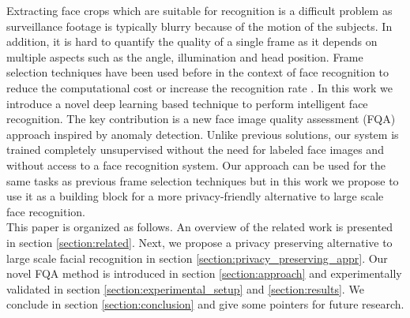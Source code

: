 \documentclass[letterpaper]{article} %
\begin{document}
Extracting face crops which are suitable for recognition is a difficult problem as surveillance footage is typically blurry because of the motion of the subjects. In addition, it is hard to quantify the quality of a single frame as it depends on multiple aspects such as the angle, illumination and head position. Frame selection techniques have been used before in the context of face recognition  to reduce the computational cost or increase the recognition rate \cite{wong_cvprw_2011, anantharajah2012quality, qi2018boosting, vignesh2015face, best2017automatic, hernandez2020biometric, terhorst2020ser}. In this work we introduce a novel deep learning based technique to perform intelligent face recognition. The key contribution is a new face image quality assessment (FQA) approach inspired by anomaly detection. Unlike previous solutions, our system is trained completely unsupervised without the need for labeled face images and without access to a face recognition system. Our approach can be used for the same tasks as previous frame selection techniques but in this work we propose to use it as a building block for a more privacy-friendly alternative to large scale face recognition.
\\
\newline
This paper is organized as follows. An overview of the related work is presented in section \ref{section:related}. Next, we propose a privacy preserving alternative to large scale facial recognition in section \ref{section:privacy_preserving_appr}. Our novel FQA method is introduced in section \ref{section:approach} and experimentally validated in  section \ref{section:experimental_setup} and \ref{section:results}. We conclude in section \ref{section:conclusion} and give some pointers for future research.
\end{document}
